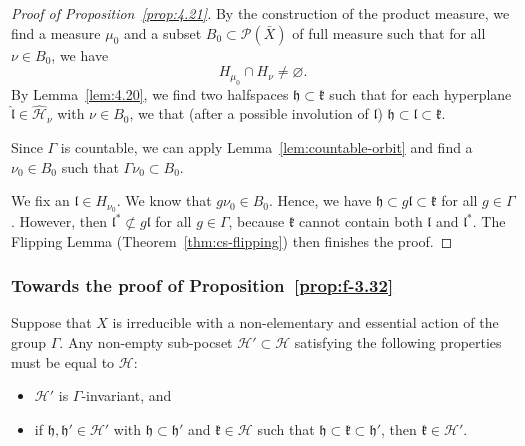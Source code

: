 \begin{proof}[Proof of Proposition~\ref{prop:4.21}]
  By the construction of the product measure, we find a measure \(\mu_0\) and a subset \(B_0 \subset \mathcal{P}(\bar X)\) of full measure such that for all \(\nu \in B_0\), we have
  \[
    H_{\mu_0} \cap H_\nu \neq \varnothing.
  \]
  By Lemma~\ref{lem:4.20}, we find two halfspaces \(\mathfrak{h} \subset \mathfrak{k}\) such that for each hyperplane \(\mathfrak{\hat l} \in \mathcal{\hat H}_\nu\) with \(\nu \in B_0\), we that (after a possible involution of \(\mathfrak{l}\)) \(\mathfrak{h} \subset \mathfrak{l} \subset \mathfrak{k}\).

  Since \(\Gamma\) is countable, we can apply Lemma~\ref{lem:countable-orbit} and find a \(\nu_0 \in B_0\) such that \(\Gamma \nu_0 \subset B_0\). 

  We fix an \(\mathfrak{l} \in H_{\nu_0}\). We know that \(g\nu_0 \in B_0\). Hence, we have \(\mathfrak{h} \subset g\mathfrak{l} \subset \mathfrak{k}\) for all \(g \in \Gamma\). However, then \(\mathfrak{l}^\ast \not \subset g\mathfrak{l}\) for all \(g \in \Gamma\), because \(\mathfrak{k}\) cannot contain both \(\mathfrak{l}\) and \(\mathfrak{l}^\ast\). The Flipping Lemma (Theorem~\ref{thm:cs-flipping}) then finishes the proof.
\end{proof}

\subsubsection*{Towards the proof of Proposition~\ref{prop:f-3.32}}

\begin{lemma}
  \label{lem:f-3.31}
  Suppose that \(X\) is irreducible with a non-elementary and essential action of the group \(\Gamma\). Any non-empty sub-pocset \(\mathcal{H}' \subset  \mathcal{H}\) satisfying the following properties must be equal to \(\mathcal{H}\):
  \begin{itemize}
  \item \(\mathcal{H}'\) is \(\Gamma\)-invariant, and
  \item if \(\mathfrak{h}, \mathfrak{h}' \in \mathcal{H}'\) with \(\mathfrak{h} \subset \mathfrak{h}'\) and \(\mathfrak{k} \in \mathcal{H}\) such that \(\mathfrak{h} \subset \mathfrak{k} \subset \mathfrak{h}'\), then \(\mathfrak{k} \in \mathcal{H}'\).
  \end{itemize}
\end{lemma}

